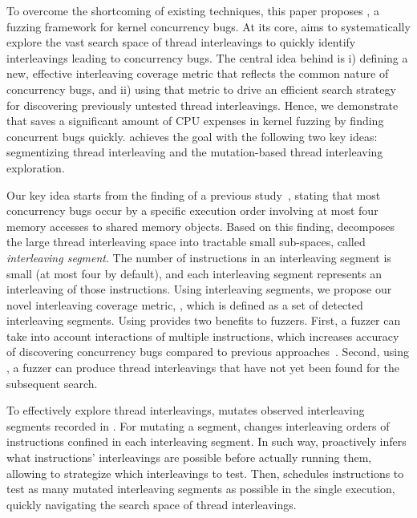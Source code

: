 To overcome the shortcoming of existing techniques, this paper proposes
\sys, a fuzzing framework for kernel concurrency bugs. 
At its core, \sys aims to systematically explore the vast search space of thread
interleavings to quickly identify
interleavings leading to concurrency bugs. The central idea behind \sys
is i) defining a new, effective interleaving coverage metric that reflects the 
common nature of concurrency bugs, and ii) using that metric to drive 
an efficient search strategy for discovering previously untested thread interleavings.
Hence, we demonstrate that \sys saves a significant amount of CPU expenses 
in kernel fuzzing by finding concurrent bugs quickly.
\sys achieves the goal with the following two key ideas:
segmentizing thread interleaving and the mutation-based thread interleaving exploration.

%
Our key idea starts from the finding of a previous
study~\cite{learningfrommistakes}, stating that most concurrency bugs
occur by a specific execution order involving at most four memory
accesses to shared memory objects.
%
Based on this finding, \sys decomposes the large thread interleaving
space into tractable small sub-spaces, called \textit{interleaving
  segment}. The number of instructions in an interleaving segment is
small (at most four by default), and each interleaving segment
represents an interleaving of those instructions.
%
Using interleaving segments, we propose our novel interleaving
coverage metric, \textit{\intcov}, which is defined as a set of
detected interleaving segments.
%
Using \intcov provides two benefits to fuzzers. First, a fuzzer can
take into account interactions of multiple instructions, which
increases accuracy of discovering concurrency bugs compared to
previous approaches~\cite{krace, conzzer}.  Second, using \intcov, a
fuzzer can produce thread interleavings that have not yet been found
for the subsequent search.

%
To effectively explore thread interleavings, \sys mutates observed
interleaving segments recorded in \intcov. For mutating a segment,
\sys changes interleaving orders of instructions confined in each
interleaving segment.
%
In such way, \sys proactively infers what instructions' interleavings
are possible before actually running them, allowing \sys to strategize
which interleavings to test.
%
Then, \sys schedules instructions to test as many mutated interleaving
segments as possible in the single execution, quickly navigating the
search space of thread interleavings.

